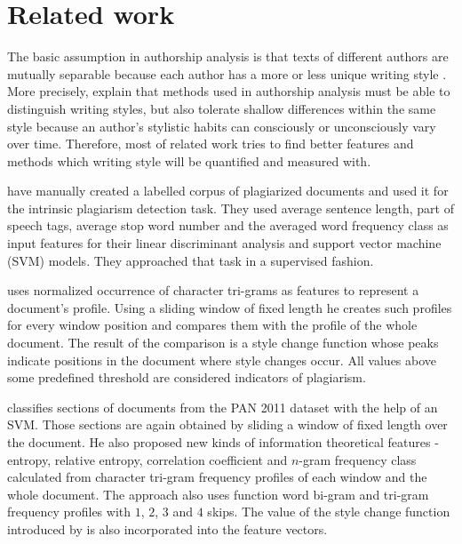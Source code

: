 \documentclass[10pt, a4paper]{article}
\begin{document}
\section{Related work}
The basic assumption in authorship analysis is that texts of different authors are mutually separable because each author has a more or less unique writing style \citep{stamatatos-2009a,ding-2016}. More precisely, \citet{koppel-2009} explain that methods used in authorship analysis must be able to distinguish writing styles, but also tolerate shallow differences within the same style because an author's stylistic habits can consciously or unconsciously vary over time. Therefore, most of related work tries to find better features and methods which writing style will be quantified and measured with.

\citet{zu-2006} have manually created a labelled corpus of plagiarized documents and used it for the intrinsic plagiarism detection task. They used average sentence length, part of speech tags, average stop word number and the averaged word frequency class as input features for their linear discriminant analysis and support vector machine (SVM) models. They approached that task in a supervised fashion. 

\citet{stamatatos-2009b} uses normalized occurrence of character tri-grams as features to represent a document's profile. Using a sliding window of fixed length he creates such profiles for every window position and compares them with the profile of the whole document. The result of the comparison is a style change function whose peaks indicate positions in the document where style changes occur. All values above some predefined threshold are considered indicators of plagiarism.

\citet{rahman-2015} classifies sections of documents from the PAN 2011 dataset with the help of an SVM. Those sections are again obtained by sliding a window of fixed length over the document. He also proposed new kinds of information theoretical features - entropy, relative entropy, correlation coefficient and $n$-gram frequency class calculated from character tri-gram frequency profiles of each window and the whole document. The approach also uses function word bi-gram and tri-gram frequency profiles with $1$, $2$, $3$ and $4$ skips. The value of the style change function introduced by \citet{stamatatos-2009b} is also incorporated into the feature vectors.
\end{document}
